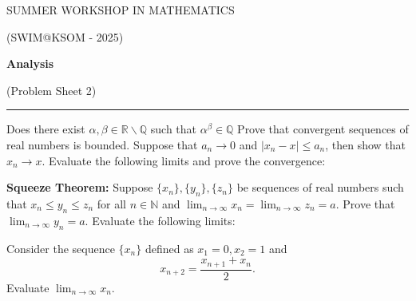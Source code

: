 \documentclass[fleqn]{exam}
\begin{document}
\begin{center}
	{\huge SUMMER WORKSHOP IN MATHEMATICS}
	
	\bigskip
	
	{\large (SWIM@KSOM - 2025)}
	
	\bigskip


	\textbf{\Large Analysis}
	
	\medskip

	{\large (Problem Sheet 2)}

	\medskip
	
	\hrule
\end{center}


\begin{questions}
	\question Does there exist $\alpha,\beta\in\mathbb{R}\backslash\mathbb{Q}$ such that $\alpha^\beta\in\mathbb{Q}$
	\question Prove that convergent sequences of real numbers is bounded.
	\question Suppose that $a_n\to 0$ and $|x_n-x|\leq a_n$, then show that $x_n\to x$.
	\question Evaluate the following limits and prove the convergence:
	\question \textbf{Squeeze Theorem: } Suppose $\{x_n\},\{y_n\},\{z_n\}$ be sequences of real numbers such that $x_n\leq y_n\leq z_n$ for all $n\in\mathbb{N}$ and $\lim_{n\to\infty}x_n=\lim_{n\to\infty}z_n=a$. Prove that $\lim_{n\to\infty}y_n=a$.
	\question Evaluate the following limits:
	\question Consider the sequence $\{x_n\}$ defined as $x_1=0,x_2=1$ and 
	\[x_{n+2}=\frac{x_{n+1}+x_{n}}{2}.\]
	Evaluate $\lim_{n\to\infty}x_n$.
\end{questions}
\end{document}
